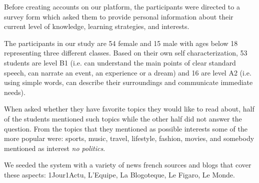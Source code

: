 Before creating accounts on our platform, the participants were directed to a survey form which asked them to provide personal information about their current level of knowledge, learning strategies, and interests. 

The participants in our study are 54 female and 15 male with ages below 18 representing three different classes. Based on their own self characterization, 53 students are level B1 (i.e. can understand the main points of clear standard speech, can narrate an event, an experience or a dream) and 16 are level A2 (i.e. using simple words, can describe their surroundings and communicate immediate needs). 


When asked whether they have favorite topics they would like to read about, half of the students mentioned such topics while the other half did not answer the question. From the topics that they mentioned as possible interests some of the more popular were: sports, music, travel, lifestyle, fashion, movies, and somebody mentioned as interest {\em no politics}.

We seeded the system with a variety of news french sources and blogs that cover these aspects: 1Jour1Actu, L'Equipe, La Blogoteque, Le Figaro, Le Monde. 











